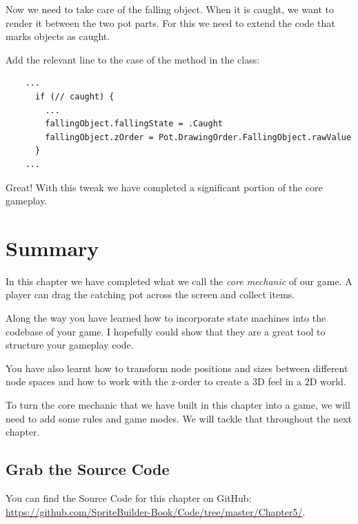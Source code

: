 Now we need to take care of the falling object. When it is caught, we want to
render it between the two pot parts. For this we need to extend the code that
marks objects as caught.
\begin{leftbar}
Add the relevant line to the  case of the
 method in the  class:
\begin{lstlisting}
    ...
      if (// caught) {
        ...
        fallingObject.fallingState = .Caught
        fallingObject.zOrder = Pot.DrawingOrder.FallingObject.rawValue
      }
    ...
\end{lstlisting}
\end{leftbar}
Great! With this tweak we have completed a significant portion of the core
gameplay.

\section{Summary} 
In this chapter we have completed what we call the \textit{core mechanic} of
our game. A player can drag the catching pot across the screen and collect
items.

Along the way you have learned how to incorporate state machines into the
codebase of your game. I hopefully could show that they are a great tool to
structure your gameplay code. 

You have also learnt how to transform node positions
and sizes between different node spaces and how to work with the z-order to
create a 3D feel in a 2D world.

To turn the core mechanic that we have built in this chapter into a game, we
will need to add some rules and game modes. We will tackle that throughout the
next chapter.

\subsection{Grab the Source Code}
You can find the Source Code for this chapter on GitHub:
\url{https://github.com/SpriteBuilder-Book/Code/tree/master/Chapter5/}.
